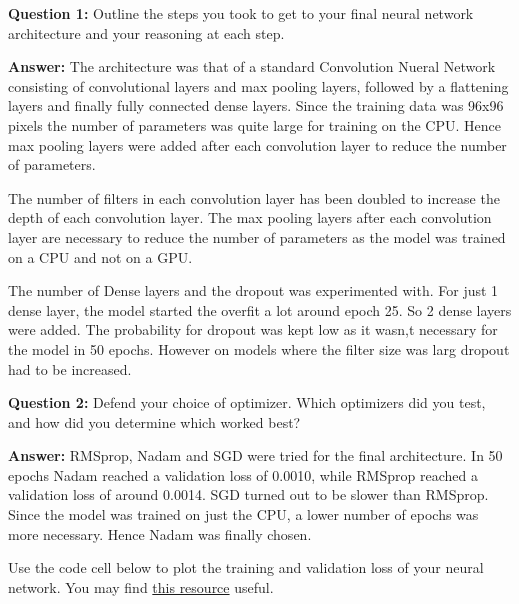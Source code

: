\documentclass[11pt]{article}
\begin{document}
\textbf{Question 1:} Outline the steps you took to get to your final
neural network architecture and your reasoning at each step.

\textbf{Answer:} The architecture was that of a standard Convolution
Nueral Network consisting of convolutional layers and max pooling
layers, followed by a flattening layers and finally fully connected
dense layers. Since the training data was 96x96 pixels the number of
parameters was quite large for training on the CPU. Hence max pooling
layers were added after each convolution layer to reduce the number of
parameters.

The number of filters in each convolution layer has been doubled to
increase the depth of each convolution layer. The max pooling layers
after each convolution layer are necessary to reduce the number of
parameters as the model was trained on a CPU and not on a GPU.

The number of Dense layers and the dropout was experimented with. For
just 1 dense layer, the model started the overfit a lot around epoch 25.
So 2 dense layers were added. The probability for dropout was kept low
as it wasn,t necessary for the model in 50 epochs. However on models
where the filter size was larg dropout had to be increased.

\textbf{Question 2:} Defend your choice of optimizer. Which optimizers
did you test, and how did you determine which worked best?

\textbf{Answer:} RMSprop, Nadam and SGD were tried for the final
architecture. In 50 epochs Nadam reached a validation loss of 0.0010,
while RMSprop reached a validation loss of around 0.0014. SGD turned out
to be slower than RMSprop. Since the model was trained on just the CPU,
a lower number of epochs was more necessary. Hence Nadam was finally
chosen.

Use the code cell below to plot the training and validation loss of your
neural network. You may find
\href{http://machinelearningmastery.com/display-deep-learning-model-training-history-in-keras/}{this
resource} useful.
\end{document}
